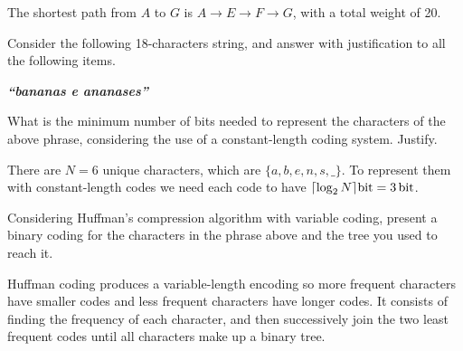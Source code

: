 {The shortest path from $A$ to $G$ is $A \rightarrow E \rightarrow F \rightarrow G$, with a total weight of 20.

Consider the following 18-characters string, and answer with justification to all the following items.
\begin{center}
    \textbf{\textit{``bananas e ananases''}}
\end{center}

What is the minimum number of bits needed to represent the characters of the above phrase, considering the use of a constant-length coding system. Justify.

\ansseparator

There are $N=6$ unique characters, which are $\{a, b, e, n, s, \_\}$. To represent them with constant-length codes we need each code to have $\lceil \log_2{N} \rceil \SI{}{\bit} = \SI{3}{\bit}$.

Considering Huffman's compression algorithm with variable coding, present a binary coding for the characters in the phrase above and the tree you used to reach it.

\ansseparator

Huffman coding produces a variable-length encoding so more frequent characters have smaller codes and less frequent characters have longer codes. It consists of finding the frequency of each character, and then successively join the two least frequent codes until all characters make up a binary tree.

}
